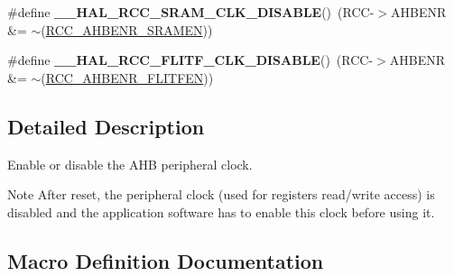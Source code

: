 \begin{DoxyCompactItemize}
\item 
\mbox{\label{group___r_c_c___a_h_b___clock___enable___disable_ga429ce8eecde9788d3daf85226b5c171b}} 
\#define {\bfseries \+\_\+\+\_\+\+H\+A\+L\+\_\+\+R\+C\+C\+\_\+\+S\+R\+A\+M\+\_\+\+C\+L\+K\+\_\+\+D\+I\+S\+A\+B\+LE}()~(R\+CC-\/$>$A\+H\+B\+E\+NR \&= $\sim$(\hyperlink{group___peripheral___registers___bits___definition_ga295a704767cb94ee624cbc4dd4c4cd9a}{R\+C\+C\+\_\+\+A\+H\+B\+E\+N\+R\+\_\+\+S\+R\+A\+M\+EN}))
\item 
\mbox{\label{group___r_c_c___a_h_b___clock___enable___disable_ga3ecbf76738d7f2b8deb65847614f7574}} 
\#define {\bfseries \+\_\+\+\_\+\+H\+A\+L\+\_\+\+R\+C\+C\+\_\+\+F\+L\+I\+T\+F\+\_\+\+C\+L\+K\+\_\+\+D\+I\+S\+A\+B\+LE}()~(R\+CC-\/$>$A\+H\+B\+E\+NR \&= $\sim$(\hyperlink{group___peripheral___registers___bits___definition_ga67a12de126652d191a1bc2c114c3395a}{R\+C\+C\+\_\+\+A\+H\+B\+E\+N\+R\+\_\+\+F\+L\+I\+T\+F\+EN}))
\end{DoxyCompactItemize}


\subsection{Detailed Description}
Enable or disable the A\+HB peripheral clock. 

\begin{DoxyNote}{Note}
After reset, the peripheral clock (used for registers read/write access) is disabled and the application software has to enable this clock before using it. 
\end{DoxyNote}


\subsection{Macro Definition Documentation}
\mbox{\label{group___r_c_c___a_h_b___clock___enable___disable_ga5222bac3ebfec517c93055ae065303da}} 
